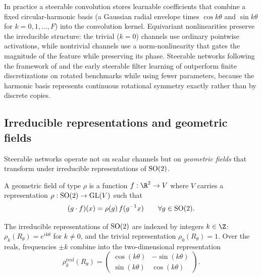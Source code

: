 In practice a steerable convolution stores learnable coefficients that combine a
fixed circular-harmonic basis (a Gaussian radial envelope times $\cos k\theta$
and $\sin k\theta$ for $k = 0, 1, \dots, F$) into the convolution kernel.
Equivariant nonlinearities preserve the irreducible structure: the trivial
($k=0$) channels use ordinary pointwise activations, while nontrivial channels
use a norm-nonlinearity that gates the magnitude of the feature while preserving
its phase. Steerable networks following the framework of
\citet{weiler2019general} and the early steerable filter learning of
\citet{weiler2018learningsteerable} outperform finite discretizations on rotated
benchmarks while using fewer parameters, because the harmonic basis represents
continuous rotational symmetry exactly rather than by discrete copies.

\subsection{Irreducible representations and geometric fields}
\label{sec:groups:irreps-fields}

Steerable networks operate not on scalar channels but on \emph{geometric
fields} that transform under irreducible representations of $\operatorname{SO}(2)$.

\begin{definition}
\label{def:groups:geometric-field}
A geometric field of type $\rho$ is a function $f: \R^2 \to V$ where $V$ carries
a representation $\rho: \operatorname{SO}(2) \to \operatorname{GL}(V)$ such that
\begin{equation}
  (g \cdot f)(x) = \rho(g)\, f(g^{-1} x) \qquad \forall g \in \operatorname{SO}(2).
\end{equation}
\end{definition}

\begin{definition}
\label{def:groups:so2-irreps}
The irreducible representations of $\operatorname{SO}(2)$ are indexed by integers $k \in \Z$:
$\rho_k(R_\theta) = e^{ik\theta}$ for $k \neq 0$, and the trivial representation
$\rho_0(R_\theta) = 1$. Over the reals, frequencies $\pm k$ combine into the
two-dimensional representation
\begin{equation}
  \rho_k^{\text{real}}(R_\theta) = \begin{pmatrix}
    \cos(k\theta) & -\sin(k\theta) \\
    \sin(k\theta) & \cos(k\theta) \end{pmatrix}.
\end{equation}
\end{definition}

